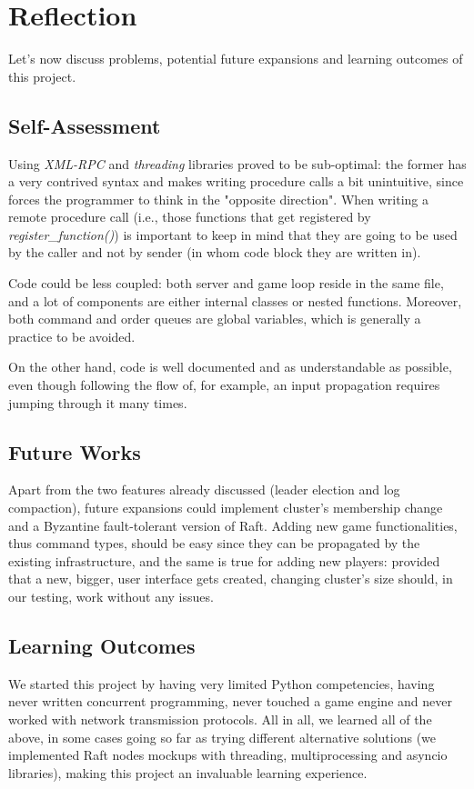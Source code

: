 \section{Reflection}

Let's now discuss problems, potential future expansions and learning outcomes of this project.

\subsection{Self-Assessment}

Using \textit{XML-RPC} and \textit{threading} libraries proved to be sub-optimal: the former has a very contrived syntax and makes writing procedure calls a bit unintuitive, since forces the programmer to think in the "opposite direction". When writing a remote procedure call (i.e., those functions that get registered by \textit{register\_function()}) is important to keep in mind that they are going to be used by the caller and not by sender (in whom code block they are written in).

Code could be less coupled: both server and game loop reside in the same file, and a lot of components are either internal classes or nested functions. Moreover, both command and order queues are global variables, which is generally a practice to be avoided.  

On the other hand, code is well documented and as understandable as possible, even though following the flow of, for example, an input propagation requires jumping through it many times.

\subsection{Future Works}

Apart from the two features already discussed (leader election and log compaction), future expansions could implement cluster's membership change and a Byzantine fault-tolerant version of Raft. Adding new game functionalities, thus command types, should be easy since they can be propagated by the existing infrastructure, and the same is true for adding new players: provided that a new, bigger, user interface gets created, changing cluster's size should, in our testing, work without any issues.  

\subsection{Learning Outcomes}

We started this project by having very limited Python competencies, having never written concurrent programming, never touched a game engine and never worked with network transmission protocols. All in all, we learned all of the above, in some cases going so far as trying different alternative solutions (we implemented Raft nodes mockups with threading, multiprocessing and asyncio libraries), making this project an invaluable learning experience. 
